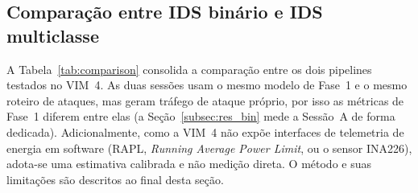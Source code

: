 \documentclass[12pt,a4paper]{article}
\begin{document}
\subsection{Comparação entre IDS binário e IDS multiclasse}
\label{subsec:res_comp}

A Tabela~\ref{tab:comparison} consolida a comparação entre os dois pipelines
testados no VIM~4. As duas sessões usam o mesmo modelo de Fase~1 e o mesmo
roteiro de ataques, mas geram tráfego de ataque próprio, por isso as métricas de
Fase~1 diferem entre elas (a Seção~\ref{subsec:res_bin} mede a Sessão~A de forma
dedicada). Adicionalmente, como a VIM~4 não expõe interfaces de
telemetria de energia em software (RAPL, \textit{Running Average Power Limit},
ou o sensor INA226), adota-se uma estimativa calibrada e não medição direta. O
método e suas limitações são descritos ao final desta seção.
\end{document}
